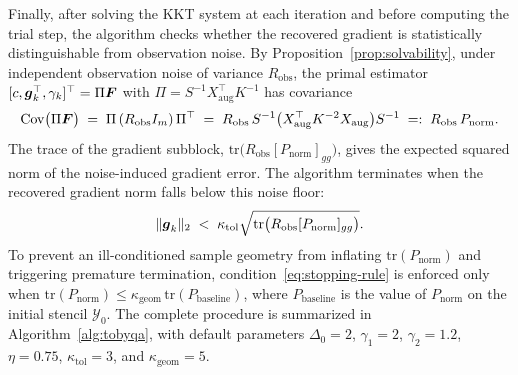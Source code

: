 Finally, after solving the KKT system at each iteration and before computing the trial step, the algorithm checks whether the recovered gradient is statistically distinguishable from observation noise. By Proposition~\ref{prop:solvability}, under independent observation noise of variance $R_{\mathrm{obs}}$, the primal estimator $[c, \boldsymbol{g}_k^\top, \gamma_k]^\top = \Pi \boldsymbol{F}$ with $\Pi = S^{-1} X_{\mathrm{aug}}^\top K^{-1}$ has covariance
\begin{equation*}
  \mathrm{Cov}\bigl(\Pi \boldsymbol{F}\bigr)
  \;=\; \Pi\,(R_{\mathrm{obs}} I_m)\,\Pi^\top
  \;=\; R_{\mathrm{obs}}\, S^{-1} \bigl(X_{\mathrm{aug}}^\top K^{-2} X_{\mathrm{aug}}\bigr) S^{-1}
  \;=:\; R_{\mathrm{obs}}\, P_{\mathrm{norm}}.
\end{equation*}
The trace of the gradient subblock, $\mathrm{tr}\bigl(R_{\mathrm{obs}} [P_{\mathrm{norm}}]_{gg}\bigr)$, gives the expected squared norm of the noise-induced gradient error. The algorithm terminates when the recovered gradient norm falls below this noise floor:
\begin{equation}\label{eq:stopping-rule}
  \|\boldsymbol{g}_k\|_2 \;<\; \kappa_{\mathrm{tol}} \sqrt{\mathrm{tr}\bigl(R_{\mathrm{obs}} [P_{\mathrm{norm}}]_{gg}\bigr)}.
\end{equation}
To prevent an ill-conditioned sample geometry from inflating $\mathrm{tr}(P_{\mathrm{norm}})$ and triggering premature termination, condition~\eqref{eq:stopping-rule} is enforced only when $\mathrm{tr}(P_{\mathrm{norm}}) \le \kappa_{\mathrm{geom}} \, \mathrm{tr}(P_{\mathrm{baseline}})$, where $P_{\mathrm{baseline}}$ is the value of $P_{\mathrm{norm}}$ on the initial stencil $\mathcal{Y}_0$. The complete procedure is summarized in Algorithm~\ref{alg:tobyqa}, with default parameters $\Delta_0=2$, $\gamma_1=2$, $\gamma_2=1.2$, $\eta=0.75$, $\kappa_{\mathrm{tol}}=3$, and $\kappa_{\mathrm{geom}}=5$.

